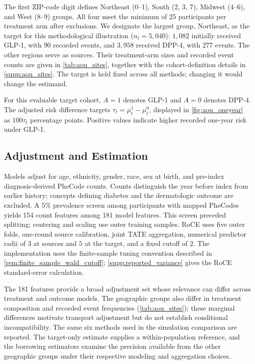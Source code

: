 \documentclass[12pt]{article}
\begin{document}
The first ZIP-code digit defines Northeast (0--1), South (2, 3, 7), Midwest (4--6), and West (8--9) groups. All four meet the minimum of 25 participants per treatment arm after exclusions. We designate the largest group, Northeast, as the target for this methodological illustration ($n_t=5{,}040$): $1{,}082$ initially received GLP-1, with 90 recorded events, and $3{,}958$ received DPP-4, with 277 events. The other regions serve as sources. Their treatment-arm sizes and recorded event counts are given in \cref{tab:aou_sites}, together with the cohort-definition details in \cref{supp:aou_sites}. The target is held fixed across all methods; changing it would change the estimand.

For this evaluable target cohort, $A=1$ denotes GLP-1 and $A=0$ denotes DPP-4. The adjusted risk difference targets $\tau_t=\mu_t^1-\mu_t^0$, displayed in \cref{fig:aou_oneyear} as $100\tau_t$ percentage points. Positive values indicate higher recorded one-year risk under GLP-1.

\subsection{Adjustment and Estimation}
Models adjust for age, ethnicity, gender, race, sex at birth, and pre-index diagnosis-derived PheCode counts. Counts distinguish the year before index from earlier history; concepts defining diabetes and the dermatologic outcome are excluded. A $5\%$ prevalence screen among participants with mapped PheCodes yields 154 count features among 181 model features. This screen preceded splitting; centering and scaling use outer training samples. RoCE uses five outer folds, one-round source calibration, joint TATE aggregation, numerical predictor radii of $3$ at sources and $5$ at the target, and a fixed cutoff of $2$. The implementation uses the finite-sample tuning convention described in \cref{rem:finite_sample_wald_cutoff}; \cref{supp:reported_variance} gives the RoCE standard-error calculation.

The 181 features provide a broad adjustment set whose relevance can differ across treatment and outcome models. The geographic groups also differ in treatment composition and recorded event frequencies (\cref{tab:aou_sites}); these marginal differences motivate transport adjustment but do not establish conditional incompatibility. The same six methods used in the simulation comparison are reported. The target-only estimate supplies a within-population reference, and the borrowing estimators examine the precision available from the other geographic groups under their respective modeling and aggregation choices.
\end{document}
